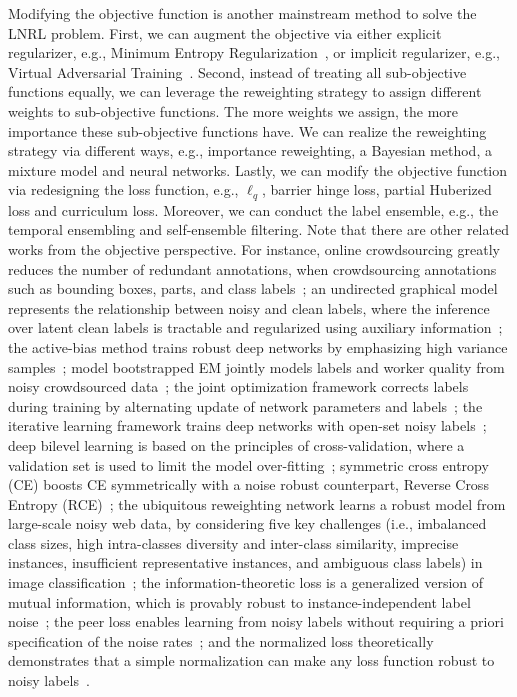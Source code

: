 Modifying the objective function is another mainstream method to solve the LNRL problem. First, we can augment the objective via either explicit regularizer, e.g., 
Minimum Entropy Regularization~, or 
implicit regularizer, e.g., 
Virtual Adversarial Training~. Second, instead of treating all sub-objective functions equally, we can leverage the reweighting strategy to assign different weights to sub-objective functions. The more weights we assign, the more importance these sub-objective functions have. We can realize the reweighting strategy via different ways, e.g., importance reweighting, a Bayesian method, a mixture model and neural networks. Lastly, we can modify the objective function via redesigning the loss function, e.g., $\ell_q$, barrier hinge loss, partial Huberized loss and curriculum loss. Moreover, we can conduct the label ensemble, e.g., the temporal ensembling and self-ensemble filtering.
Note that there are other related works from the objective perspective. For instance, online crowdsourcing greatly reduces the number of redundant annotations, when crowdsourcing annotations such as bounding boxes, parts, and class labels~; an undirected graphical model represents the relationship between noisy and clean labels, where the inference over latent clean labels is tractable and regularized using auxiliary information~; the active-bias method trains robust deep networks by emphasizing high variance samples~; model bootstrapped EM jointly models labels and worker quality from noisy crowdsourced data~; the joint optimization framework corrects labels during training by alternating update of network parameters and labels~; the iterative learning framework trains deep networks with open-set noisy labels~; deep bilevel learning is based on the principles of cross-validation, where a validation set is used to limit the model over-fitting~; symmetric cross entropy (CE) boosts CE symmetrically with a noise robust counterpart,  Reverse Cross Entropy (RCE)~; the ubiquitous reweighting network learns a robust model from large-scale noisy web data, by considering five key challenges (i.e., imbalanced class sizes, high intra-classes diversity and inter-class similarity, imprecise instances, insufficient representative instances, and ambiguous class labels) in image classification~; the information-theoretic loss is a generalized version of mutual information, which is provably robust to instance-independent label noise~; the peer loss enables learning from noisy labels without requiring a priori specification of the noise rates~; and the normalized loss theoretically demonstrates that a simple normalization can make any loss function robust to noisy labels~.

